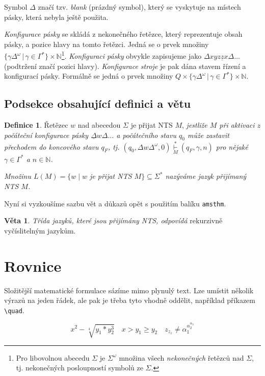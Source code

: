 \documentclass[11pt,twocolumn,a4paper]{article}
\theoremstyle{definition}
\newtheorem{definition}{Definice}
\newtheorem{theorem}{Věta}
\begin{document}
Symbol $\Delta$ značí tzv. \emph{blank} (prázdný symbol), který se vyskytuje na místech pásky, která nebyla ještě použita.

\emph{Konfigurace pásky} se skládá z nekonečného řetězce, který reprezentuje obsah pásky, a pozice hlavy na tomto řetězci. Jedná se o prvek množiny $\{\gamma \Delta^\omega \,|\, \gamma \in \Gamma^\ast \} \times \mathbb{N}$\footnote[1]{Pro libovolnou abecedu $\Sigma$ je $\Sigma^\omega$ množina všech \emph{nekonečných} řetězců nad $\Sigma$, tj. nekonečných posloupností symbolů ze $\Sigma$.}.
\emph{Konfiguraci pásky} obvykle zapisujeme jako $\Delta xyz\underline{z}x\Delta\ldots$ (podtržení značí pozici hlavy).
\emph{Konfigurace stroje} je pak dána stavem řízení a konfigurací pásky. Formálně se jedná o prvek množiny $Q \times \{\gamma \Delta ^\omega \,|\, \gamma \in \Gamma^\ast\} \times \mathbb{N}$.

\subsection{Podsekce obsahující definici a větu}

\begin{definition}
\label{def2}
    Řetězec $w$ nad abecedou $\Sigma$ je přijat NTS 
    $M$, \emph{jestliže \:$M$\: při aktivaci z počáteční konfigurace pásky $\underline{\Delta}w\Delta\ldots$ a počátečního stavu $q_0$ může zastavit přechodem
    do koncového stavu $q_F$, tj. $(q_0,\Delta w \Delta^\omega, 0) \overset{\ast}{\underset{M}{\vdash}} (q_F, \gamma, n)$ pro nějaké $\gamma \in \Gamma^\ast$ a $n \in \mathbb{N}$.}
    
    \emph{Množinu $L(M)=\{w\;|\;w$ je přijat NTS $M\} \subseteq \Sigma^\ast$ nazýváme \textnormal{jazyk přijímaný NTS} $M$.}
\end{definition}
    Nyní si vyzkoušíme sazbu vět a důkazů opět s použitím balíku \texttt{amsthm}.
\begin{theorem}
    \emph{Třída jazyků, které jsou přijímány NTS, odpovídá} rekurzivně vyčíslitelným jazykům.
\end{theorem}
\section{Rovnice}
Složitější matematické formulace sázíme mimo plynulý text. Lze umístit několik výrazů na jeden řádek, ale pak je třeba tyto vhodně oddělit, například příkazem \verb|\quad|.

\begin{equation}
    x^2-\sqrt[4]{y_1*y_2^3} \quad x>y_1\geq y_2 \quad z_{z_z}\neq \alpha _1^{\alpha_{2}^{\alpha_{3}}} \nonumber
\end{equation}
\end{document}
